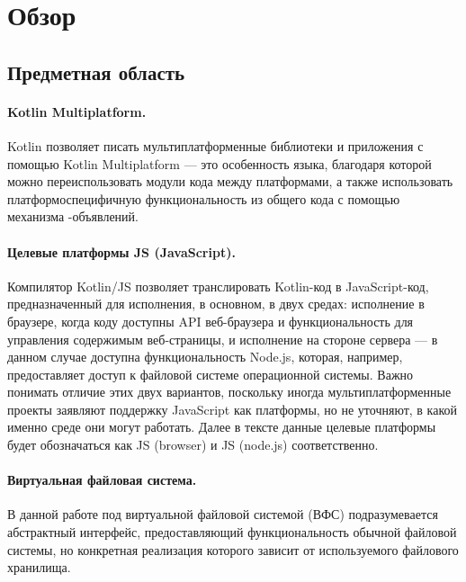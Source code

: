 \section{Обзор}\label{overview}

\subsection{Предметная область}

  \paragraph{Kotlin Multiplatform.} Kotlin позволяет писать мультиплатформенные библиотеки и приложения с помощью Kotlin Multiplatform\cite{kotlin-multiplatform} --- это особенность языка, благодаря которой можно переиспользовать модули кода между платформами, а также использовать платформоспецифичную функциональность из общего кода с помощью механизма -объявлений.

  \paragraph{Целевые платформы JS (JavaScript).} Компилятор Kotlin/JS\cite{kotlin-js} позволяет транслировать Kotlin-код в JavaScript-код, предназначенный для исполнения, в основном, в двух средах: исполнение в браузере, когда коду доступны API веб-браузера и функциональность для управления содержимым веб-страницы, и исполнение на стороне сервера --- в данном случае доступна функциональность Node.js, которая, например, предоставляет доступ к файловой системе операционной системы\cite{nodejs-browser-diff}. Важно понимать отличие этих двух вариантов, поскольку иногда мультиплатформенные проекты заявляют поддержку JavaScript как платформы, но не уточняют, в какой именно среде они могут работать. Далее в тексте данные целевые платформы будет обозначаться как JS (browser) и JS (node.js) соответственно.

  \paragraph{Виртуальная файловая система.} В данной работе под виртуальной файловой системой\cite{wiki-vfs} (ВФС) подразумевается абстрактный интерфейс, предоставляющий функциональность обычной файловой системы, но конкретная реализация которого зависит от используемого файлового хранилища.


